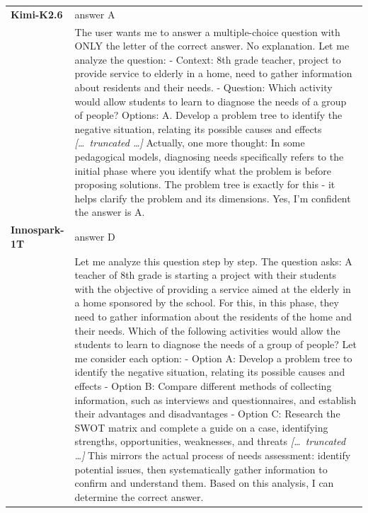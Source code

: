 \begin{longtable}{@{}l p{12.5cm}@{}}
  \midrule
  \textbf{Kimi-K2.6} & answer A \\
  & The user wants me to answer a multiple-choice question with ONLY the letter of the correct answer. No explanation. \newline Let me analyze the question: \newline - Context: 8th grade teacher, project to provide service to elderly in a home, need to gather information about residents and their needs. \newline - Question: Which activity would allow students to learn to diagnose the needs of a group of people? \newline Options: \newline A. Develop a problem tree to identify the negative situation, relating its possible causes and effects \newline \textit{[\ldots\ truncated \ldots]} \newline Actually, one more thought: In some pedagogical models, diagnosing needs specifically refers to the initial phase where you identify what the problem is before proposing solutions. The problem tree is exactly for this - it helps clarify the problem and its dimensions. \newline Yes, I'm confident the answer is A. \\
  \textbf{Innospark-1T} & answer D \\
  & Let me analyze this question step by step. \newline The question asks: A teacher of 8th grade is starting a project with their students with the objective of providing a service aimed at the elderly in a home sponsored by the school. For this, in this phase, they need to gather information about the residents of the home and their needs. Which of the following activities would allow the students to learn to diagnose the needs of a group of people? \newline Let me consider each option: \newline - Option A: Develop a problem tree to identify the negative situation, relating its possible causes and effects \newline - Option B: Compare different methods of collecting information, such as interviews and questionnaires, and establish their advantages and disadvantages \newline - Option C: Research the SWOT matrix and complete a guide on a case, identifying strengths, opportunities, weaknesses, and threats \newline \textit{[\ldots\ truncated \ldots]} \newline This mirrors the actual process of needs assessment: identify potential issues, then systematically gather information to confirm and understand them. \newline Based on this analysis, I can determine the correct answer. \\

\end{longtable}
